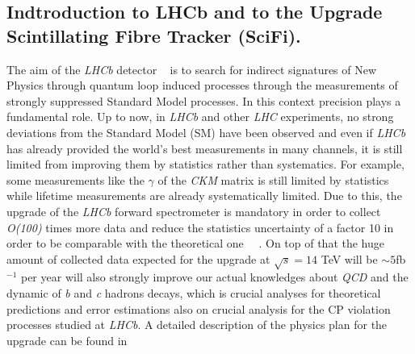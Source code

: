 \documentclass[paper=a4, fontsize=10pt]{scrartcl}
\numberwithin{equation}{section}		%
\numberwithin{figure}{section}			%
\numberwithin{table}{section}				%
\begin{document}
\subsection{Indtroduction to LHCb and to the Upgrade Scintillating Fibre Tracker (SciFi).}
The aim of the \textit{LHCb} detector ~\cite{Blake1} is to search for indirect signatures of New Physics through quantum loop induced processes through the measurements of strongly suppressed Standard Model processes.
In this context precision plays a fundamental role. 
Up to now, in \textit{LHCb} and other \textit{LHC} experiments, no strong deviations from the Standard Model (SM) have been observed and even if \textit{LHCb} has already provided the world's best measurements in many channels, it is still limited from improving them by statistics rather than systematics. For example, some measurements like the $\gamma$ of the \textit{CKM} matrix is still limited by statistics while lifetime measurements are already systematically limited. Due to this, the upgrade of the \textit{LHCb} forward spectrometer is mandatory in order to collect \textit{O(100)} times more data and reduce the statistics uncertainty of a factor 10 in order to be comparable with the theoretical one ~\cite{Blake2}~\cite{Blake3}. On top of that the huge amount of collected data expected for the upgrade at $\sqrt{s} = 14$ TeV will be $\sim 5$fb$^{-1}$ per year  will also strongly improve our actual knowledges about \textit{QCD} and the dynamic of \textit{b} and \textit{c} hadrons decays, which is crucial analyses for theoretical predictions and error estimations also on crucial analysis for the CP violation processes studied at \textit{LHCb}. A detailed description of the physics plan for the upgrade can be found in ~\cite{LetterIntent}
\end{document}
